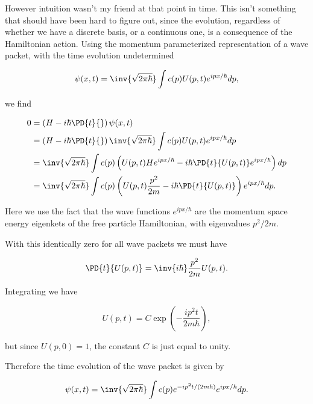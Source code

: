 However intuition wasn't my friend at that point in time.  This isn't something that should have been hard to figure out, since the evolution, regardless of whether we have a discrete basis, or a continuous one, is a consequence of the Hamiltonian action.  Using the momentum parameterized representation of a wave packet, with the time evolution undetermined

\begin{equation}\label{eqn:qmTwoExamReflection:n}
\psi(x, t) = \inv{\sqrt{2 \pi \hbar}} \int c(p) U(p, t) e^{i p x/\hbar} dp,
\end{equation}

we find

\begin{align*}
0 &= 
\left(H - i \hbar \PD{t}{}\right) 
\psi(x, t) \\
&=
\left(H - i \hbar \PD{t}{}\right) 
\inv{\sqrt{2 \pi \hbar}} \int c(p) U(p, t) e^{i p x/\hbar} dp \\
&=
\inv{\sqrt{2 \pi \hbar}} \int c(p) \left( 
U(p, t) H e^{i p x/\hbar} 
-i \hbar \PD{t}{U(p, t)} e^{i p x/\hbar} 
\right) dp  \\
&=
\inv{\sqrt{2 \pi \hbar}} \int c(p) \left( 
U(p, t) \frac{p^2}{2m} 
-i \hbar \PD{t}{U(p, t)} 
\right) 
e^{i p x/\hbar} 
dp.
\end{align*}

Here we use the fact that the wave functions $e^{i p x/\hbar}$ are the momentum space energy eigenkets of the free particle Hamiltonian, with eigenvalues $p^2/2m$.

With this identically zero for all wave packets we must have

\begin{equation}\label{eqn:qmTwoExamReflection:n}
\PD{t}{U(p, t)} 
= 
\inv{i \hbar}
\frac{p^2}{2m} 
U(p, t).
\end{equation}

Integrating we have

\begin{equation}\label{eqn:qmTwoExamReflection:n}
U(p, t) = C \exp\left( -\frac{i p^2 t}{2m \hbar} \right),
\end{equation}

but since $U(p, 0) = 1$, the constant $C$ is just equal to unity.

Therefore the time evolution of the wave packet is given by

\begin{equation}\label{eqn:qmTwoExamReflection:n}
\psi(x, t) = \inv{\sqrt{2 \pi \hbar}} \int c(p) e^{-i p^2 t/(2m \hbar)} e^{i p x/\hbar} dp.
\end{equation}

